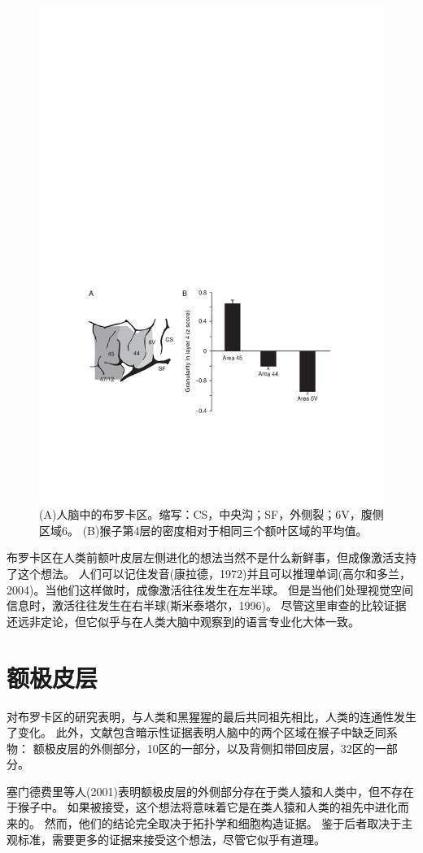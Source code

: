 \begin{figure}[!htb]
	\centering
	\includegraphics[width=0.5\linewidth]{chap9/9_3}
	\caption{(A)人脑中的布罗卡区。缩写：CS，中央沟；SF，外侧裂；6V，腹侧区域6。
		(B)猴子第4层的密度相对于相同三个额叶区域的平均值\cite{petrides2005orofacial}。\label{fig:fig_9_3}}
\end{figure}

\par

布罗卡区在人类前额叶皮层左侧进化的想法当然不是什么新鲜事，但成像激活支持了这个想法。
人们可以记住发音(康拉德，1972)并且可以推理单词(高尔和多兰，2004)。当他们这样做时，成像激活往往发生在左半球。
但是当他们处理视觉空间信息时，激活往往发生在右半球(斯米泰塔尔，1996)。
尽管这里审查的比较证据还远非定论，但它似乎与在人类大脑中观察到的语言专业化大体一致。



\section{额极皮层}

对布罗卡区的研究表明，与人类和黑猩猩的最后共同祖先相比，人类的连通性发生了变化。
此外，文献包含暗示性证据表明人脑中的两个区域在猴子中缺乏同系物：
额极皮层的外侧部分，10区的一部分，以及背侧扣带回皮层，32区的一部分。
\par


塞门德费里等人(2001)表明额极皮层的外侧部分存在于类人猿和人类中，但不存在于猴子中。
如果被接受，这个想法将意味着它是在类人猿和人类的祖先中进化而来的。
然而，他们的结论完全取决于拓扑学和细胞构造证据。
鉴于后者取决于主观标准，需要更多的证据来接受这个想法，尽管它似乎有道理。
\par



